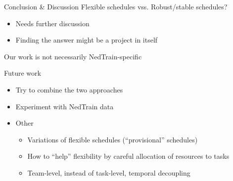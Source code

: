 \begin{frame}{Conclusion \& Discussion}
	Flexible schedules vss. Robust/stable schedules?
	\begin{itemize}
		\item Needs further discussion
		\item Finding the answer might be a project in itself
	\end{itemize}

	\medskip

	Our work is not necessarily NedTrain-specific

	\pause
	\medskip

	Future work
	\begin{itemize}
		\item Try to combine the two approaches
		\item Experiment with NedTrain data
		\item Other
		\begin{itemize}
			\item Variations of flexible schedules (``provisional'' schedules)
			\item How to ``help'' flexibility by careful allocation of resources to tasks
			\item Team-level, instead of task-level, temporal decoupling
		\end{itemize}
	\end{itemize}
\end{frame}
	
